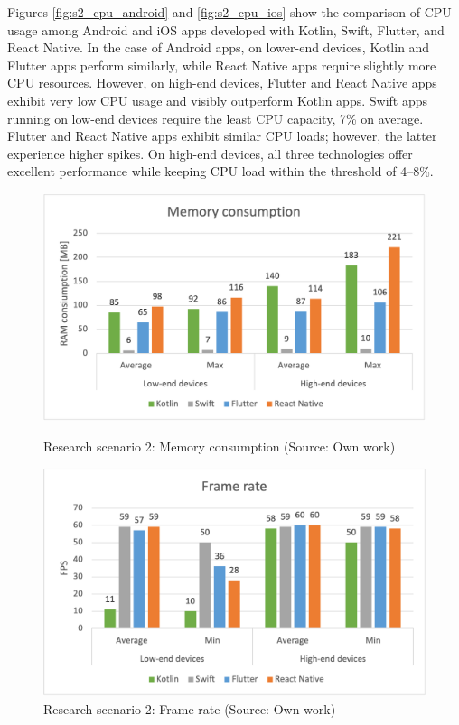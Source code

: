 Figures \ref{fig:s2_cpu_android} and \ref{fig:s2_cpu_ios} show the comparison of CPU usage among Android and iOS apps developed with Kotlin, Swift, Flutter, and React Native. In the case of Android apps, on lower-end devices, Kotlin and Flutter apps perform similarly, while React Native apps require slightly more CPU resources. However, on high-end devices, Flutter and React Native apps exhibit very low CPU usage and visibly outperform Kotlin apps. Swift apps running on low-end devices require the least CPU capacity, 7\% on average. Flutter and React Native apps exhibit similar CPU loads; however, the latter experience higher spikes. On high-end devices, all three technologies offer excellent performance while keeping CPU load within the threshold of 4--8\%.

\begin{figure}[H]
    \begin{minipage}{.48\textwidth}
        \includegraphics[width=\textwidth]{img/scenario2_ram}
        \caption{Research scenario 2: Memory consumption (Source: Own work)}
        \label{fig:s2_ram}
    \end{minipage}
    \hfill
    \begin{minipage}{.48\textwidth}
        \includegraphics[width=\textwidth]{img/scenario2_fps}
    \caption{Research scenario 2: Frame rate (Source: Own work)}
    \label{fig:s2_fps}
    \end{minipage}
\end{figure}

